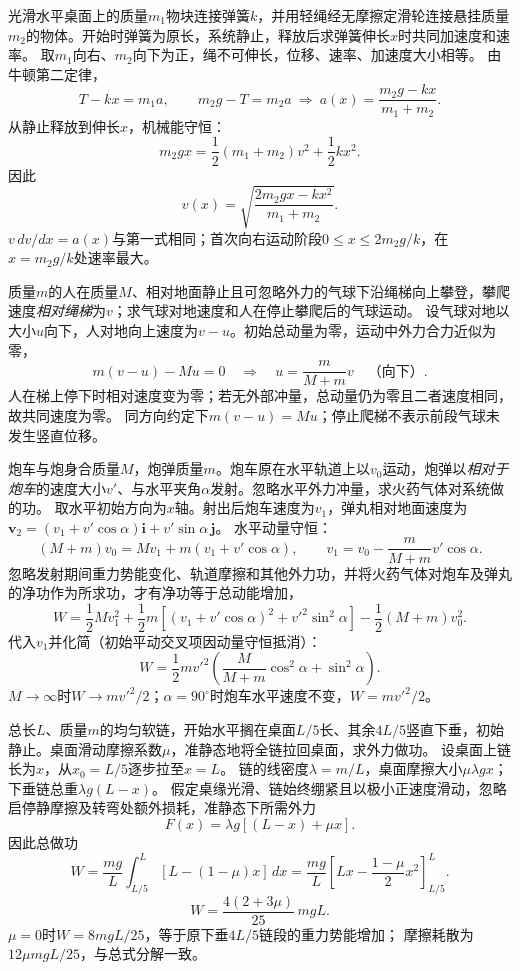 \problemtext 光滑水平桌面上的质量$m_1$物块连接弹簧$k$，并用轻绳经无摩擦定滑轮连接悬挂质量$m_2$的物体。开始时弹簧为原长，系统静止，释放后求弹簧伸长$x$时共同加速度和速率。
\workings
取$m_1$向右、$m_2$向下为正，绳不可伸长，位移、速率、加速度大小相等。
由牛顿第二定律，
\[
 T-kx=m_1a,\qquad m_2g-T=m_2a
 \ \Longrightarrow\
 \boxed{a(x)=\frac{m_2g-kx}{m_1+m_2}}.
\]
从静止释放到伸长$x$，机械能守恒：
\[
m_2gx=\frac12(m_1+m_2)v^2+\frac12kx^2.
\]
因此
\[
\boxed{v(x)=\sqrt{\frac{2m_2gx-kx^2}{m_1+m_2}}}.
\]
\crosscheck $v\,dv/dx=a(x)$与第一式相同；首次向右运动阶段$0\le x\le2m_2g/k$，在$x=m_2g/k$处速率最大。

\problemtext 质量$m$的人在质量$M$、相对地面静止且可忽略外力的气球下沿绳梯向上攀登，攀爬速度\emph{相对绳梯}为$v$；求气球对地速度和人在停止攀爬后的气球运动。
\workings
设气球对地以大小$u$向下，人对地向上速度为$v-u$。初始总动量为零，运动中外力合力近似为零，
\[
m(v-u)-Mu=0
\quad\Longrightarrow\quad
\boxed{u=\frac{m}{M+m}v}\quad\text{（向下）}.
\]
人在梯上停下时相对速度变为零；若无外部冲量，总动量仍为零且二者速度相同，故共同速度为零。
\crosscheck 同方向约定下$m(v-u)=Mu$；停止爬梯不表示前段气球未发生竖直位移。

\problemtext 炮车与炮身合质量$M$，炮弹质量$m$。炮车原在水平轨道上以$v_0$运动，炮弹以\emph{相对于炮车}的速度大小$v'$、与水平夹角$\alpha$发射。忽略水平外力冲量，求火药气体对系统做的功。
\workings
取水平初始方向为$x$轴。射出后炮车速度为$v_1$，弹丸相对地面速度为
$\bm v_2=(v_1+v'\cos\alpha)\bm i+v'\sin\alpha\,\bm j$。
水平动量守恒：
\[
(M+m)v_0=Mv_1+m(v_1+v'\cos\alpha),
\qquad
v_1=v_0-\frac{m}{M+m}v'\cos\alpha.
\]
忽略发射期间重力势能变化、轨道摩擦和其他外力功，并将火药气体对炮车及弹丸的净功作为所求功，才有净功等于总动能增加，
\[
W=\frac12Mv_1^2+\frac12m\left[
 (v_1+v'\cos\alpha)^2+v'^2\sin^2\alpha\right]
 -\frac12(M+m)v_0^2.
\]
代入$v_1$并化简（初始平动交叉项因动量守恒抵消）：
\[
\boxed{W=\frac12mv'^2\left(
\frac{M}{M+m}\cos^2\alpha+\sin^2\alpha\right)}.
\]
\crosscheck $M\to\infty$时$W\to mv'^2/2$；$\alpha=90^\circ$时炮车水平速度不变，$W=mv'^2/2$。

\problemtext 总长$L$、质量$m$的均匀软链，开始水平搁在桌面$L/5$长、其余$4L/5$竖直下垂，初始静止。桌面滑动摩擦系数$\mu$，准静态地将全链拉回桌面，求外力做功。
\workings
设桌面上链长为$x$，从$x_0=L/5$逐步拉至$x=L$。
链的线密度$\lambda=m/L$，桌面摩擦大小$\mu\lambda gx$；下垂链总重$\lambda g(L-x)$。
假定桌缘光滑、链始终绷紧且以极小正速度滑动，忽略启停静摩擦及转弯处额外损耗，准静态下所需外力
\[
F(x)=\lambda g[(L-x)+\mu x].
\]
因此总做功
\[
W=\frac{mg}{L}\int_{L/5}^{L}
 [L-(1-\mu)x]\,dx
=\frac{mg}{L}\left[
Lx-\frac{1-\mu}{2}x^2\right]_{L/5}^L.
\]
\[
\boxed{W=\frac{4(2+3\mu)}{25}\,mgL}.
\]
\crosscheck $\mu=0$时$W=8mgL/25$，等于原下垂$4L/5$链段的重力势能增加；
摩擦耗散为$12\mu mgL/25$，与总式分解一致。

